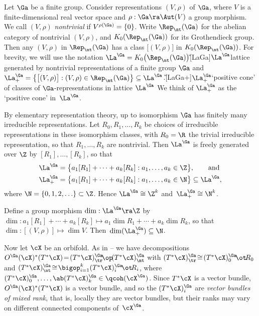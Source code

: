 \documentclass{article}
\begin{document}
\begin{dfn} Let $\Ga$ be a finite group. Consider representations
$(V,\rho)$ of $\Ga$, where $V$ is a finite-dimensional real vector
space and $\rho:\Ga\ra\Aut(V)$ a group morphism. We call $(V,\rho)$
{\it nontrivial\/} if $V^{\rho(\Ga)}=\{0\}$. Write $\Rep_\nt(\Ga)$
for the abelian category of nontrivial
$(V,\rho)$, and $K_0(\Rep_\nt(\Ga))$ for its Grothendieck group.
Then any $(V,\rho)$ in $\Rep_\nt(\Ga)$ has a class
$\bigl[(V,\rho)\bigr]$ in $K_0(\Rep_\nt(\Ga))$. For brevity, we will
use the notation
$\La^\Ga=K_0\bigl(\Rep_\nt(\Ga)\bigr)$\G[LaGa]{$\La^\Ga$}{lattice
generated by nontrivial representations of a finite group $\Ga$} and
$\La^\Ga_+=\bigl\{\bigl[(V,\rho)\bigr]:(V,\rho)\in\Rep_\nt(\Ga)\bigr\}
\subseteq\La^\Ga$.\G[LaGa+]{$\La^\Ga_+$}{`positive cone' of classes
of $\Ga$-representations in lattice $\La^\Ga$} We think of
$\La^\Ga_+$ as the `positive cone' in~$\La^\Ga$.

By elementary representation theory, up to isomorphism $\Ga$ has
finitely many irreducible representations. Let $R_0,R_1,\ldots,R_k$
be choices of irreducible representations in these isomorphism
classes, with $R_0=\R$ the trivial irreducible representation, so
that $R_1,\ldots,R_k$ are nontrivial. Then $\La^\Ga$ is freely
generated over $\Z$ by $[R_1],\ldots,[R_k]$, so that
\begin{align*}
\La^\Ga&=\bigl\{a_1[R_1]+\cdots+a_k[R_k]:a_1,\ldots,a_k\in\Z\bigr\},
\qquad\text{and}\\
\La^\Ga_+&=\bigl\{a_1[R_1]+\cdots+a_k[R_k]:a_1,\ldots,a_k\in\N\bigr\}
\subseteq\La^\Ga,
\end{align*}
where $\N=\{0,1,2,\ldots\}\subset\Z$. Hence $\La^\Ga\cong\Z^k$
and~$\La^\Ga_+\cong\N^k$.

Define a group morphism $\dim:\La^\Ga\ra\Z$ by
$\dim:a_1[R_1]+\cdots+a_k[R_k]\mapsto a_1\dim R_1+\cdots+a_k\dim
R_k$, so that $\dim:[(V,\rho)]\mapsto\dim V$.
Then~$\dim(\La^\Ga_+)\subseteq\N$.

Now let $\cX$ be an orbifold. As in -- we
have decompositions $O^\Ga(\cX)^*(T^*\cX)\!=\!(T^*\cX)^\Ga_\tr\!
\op\! (T^*\cX)^\Ga_\nt$ with
$(T^*\cX)^\Ga_\tr\!\cong\!(T^*\cX)^\Ga_0\!\ot\! R_0$ and
$(T^*\cX)^\Ga_\nt \!\cong\!\bigop_{i=1}^k(T^*\cX)^\Ga_i\!\ot\! R_i$,
where $(T^*\cX)^\Ga_0,\ldots,\ab(T^*\cX)^\Ga_k\in\qcoh(\cX^\Ga)$.
Since $T^*\cX$ is a vector bundle, $O^\Ga(\cX)^*(T^*\cX)$ is a
vector bundle, and so the $(T^*\cX)^\Ga_i$ are {\it vector bundles
of mixed rank}, that is, locally they are vector bundles, but their
ranks may vary on different connected components of~$\cX^\Ga$.


\end{dfn}
\end{document}
